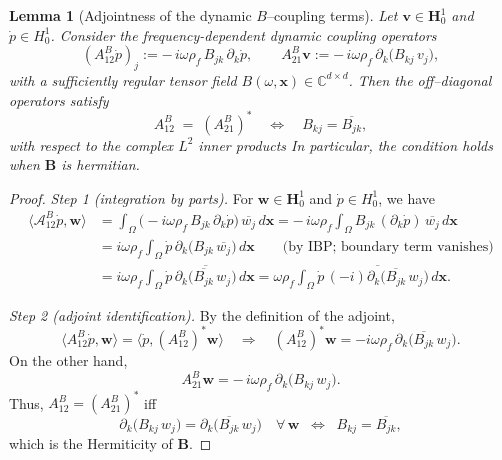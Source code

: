 \documentclass[10pt,a4paper]{amsart}
\newtheorem{lemma}{Lemma}
\def \bmv {\bm{v}}
\def \bmw {\bm{w}}
\def \calA {\mathcal{A}}
\begin{document}
	\begin{lemma}[Adjointness of the dynamic $B$--coupling terms]
		Let $\bmv\in \bm{H}_{0}^{1}$ and $\dot{p}\in H^{1}_{0}$. Consider the frequency-dependent dynamic coupling operators
		\[
		(A_{12}^B \dot p)_j := -\,i\omega \rho_f\, B_{j k}\,\partial_k \dot p,
		\qquad
		A_{21}^B \mathbf{v} := -\,i\omega \rho_f\, \partial_k\!\big(B_{k j}\,v_j\big),
		\]
		with a sufficiently regular tensor field $B(\omega,\mathbf{x})\in\mathbb{C}^{d\times d}$.
		Then the off--diagonal operators satisfy
		\[
		A_{12}^B \;=\; (A_{21}^B)^{*}
		\quad\Longleftrightarrow\quad
		B_{k j} = \overline{B_{j k}},
		\]
		with respect to the complex $L^2$ inner products
		In particular, the condition holds when $\bm{B}$ is hermitian.
	\end{lemma}

	\begin{proof}
		\emph{Step 1 (integration by parts).}
		For $\bmw\in \bm{H}_{0}^{1}$ and $\dot{p}\in H^{1}_{0}$, we have
		\[
		\begin{aligned}
			\langle \calA_{12}^B \dot p, \mathbf{w}\rangle
			&= \int_\Omega \big(-i\omega\rho_f\, B_{j k}\,\partial_k \dot p\big)\,\overline{w_j}\,d\bm{x}
			= -\,i\omega\rho_f \int_\Omega B_{j k}\,(\partial_k \dot p)\,\overline{w_j}\,d\bm{x}
			\\
			&= i\omega\rho_f \int_\Omega \dot p\,\partial_k\big(B_{j k}\,\overline{w_j}\big)\,d\bm{x}
			\qquad\text{(by IBP; boundary term vanishes)}
			\\
			&= i\omega\rho_f \int_\Omega \dot p\,\overline{\partial_k\big(\overline{B_{j k}}\,w_j\big)}\,d\bm{x}
			= \omega\rho_f \int_\Omega \dot p\,\overline{(-i)\partial_k\big(\overline{B_{j k}}\,w_j\big)}\,d\bm{x}.
		\end{aligned}
		\]
		
		\emph{Step 2 (adjoint identification).}
		By the definition of the adjoint,
		\[
		\langle A_{12}^B \dot p, \mathbf{w}\rangle
		= \langle \dot p,(A_{12}^B)^{*}\mathbf{w}\rangle
		\quad\Rightarrow\quad
		(A_{12}^B)^{*}\mathbf{w} = -i\omega\rho_f\,\partial_k\big(\overline{B_{j k}}\,w_j\big).
		\]
		On the other hand,
		\[
		A_{21}^B \mathbf{w} = -\,i\omega\rho_f\,\partial_k\big(B_{k j}\,w_j\big).
		\]
		Thus, $A_{12}^B = (A_{21}^B)^{*}$ iff
		\[
		\partial_k\big(B_{k j}\,w_j\big) = \partial_k\big(\overline{B_{j k}}\,w_j\big)\quad\forall\,\mathbf{w}
		\;\;\Longleftrightarrow\;\;
		B_{k j} = \overline{B_{j k}},
		\]
		which is the Hermiticity of $\bm{B}$.
	\end{proof}
\end{document}
